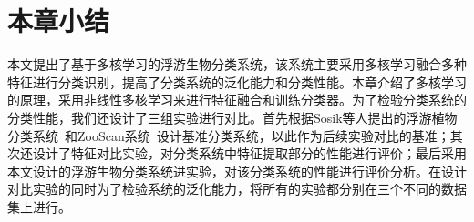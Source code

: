 
\section{本章小结}

本文提出了基于多核学习的浮游生物分类系统，该系统主要采用多核学习融合多种特征进行分类识别，提高了分类系统的泛化能力和分类性能。本章介绍了多核学习的原理，采用非线性多核学习来进行特征融合和训练分类器。为了检验分类系统的分类性能，我们还设计了三组实验进行对比。首先根据Sosik等人提出的浮游植物分类系统~\cite{sosik2007automated}和ZooScan系统~\cite{gorsky2010digital}设计基准分类系统，以此作为后续实验对比的基准；其次还设计了特征对比实验，对分类系统中特征提取部分的性能进行评价；最后采用本文设计的浮游生物分类系统进实验，对该分类系统的性能进行评价分析。在设计对比实验的同时为了检验系统的泛化能力，将所有的实验都分别在三个不同的数据集上进行。
